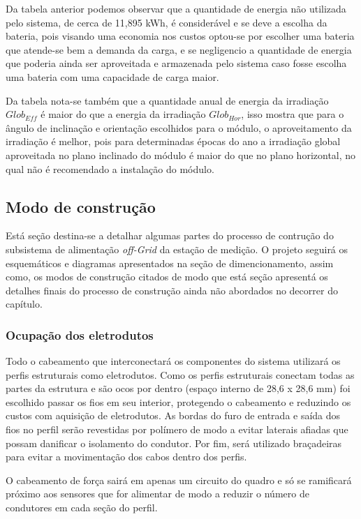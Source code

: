	Da tabela anterior podemos observar que a quantidade de energia não utilizada pelo sistema, de cerca de 11,895 kWh, é considerável e se deve a escolha da bateria, pois visando uma economia nos custos optou-se por escolher uma bateria que atende-se bem a demanda da carga, e se negligencio a quantidade de energia que poderia ainda ser aproveitada e armazenada pelo sistema caso fosse escolha uma bateria com uma capacidade de carga maior. 
	
	Da tabela nota-se também que a quantidade anual de energia da irradiação $Glob_{Eff}$ é maior do que a energia da irradiação $Glob_{Hor}$, isso mostra que para o ângulo de inclinação e orientação escolhidos para o módulo, o aproveitamento da irradiação é melhor, pois para determinadas épocas do ano a irradiação global aproveitada no plano inclinado do módulo é maior do que no plano horizontal, no qual não é recomendado a instalação do módulo.

\subsection{Modo de construção}

Está seção destina-se a detalhar algumas partes do processo de contrução do subsistema de alimentação \textit{off-Grid} da estação de medição. O projeto seguirá os esquemáticos e diagramas apresentados na seção de dimencionamento, assim como, os modos de construção citados de modo que está seção apresentá os detalhes finais do processo de construção ainda não abordados no decorrer do capítulo.

\subsubsection{Ocupação dos eletrodutos}

Todo o cabeamento que interconectará os componentes do sistema utilizará os perfis estruturais como eletrodutos. Como os perfis estruturais conectam todas as partes da estrutura e são ocos por dentro (espaço interno de 28,6 x 28,6 mm) foi escolhido passar os fios em seu interior, protegendo o cabeamento e reduzindo os custos com aquisição de eletrodutos. As bordas do furo de entrada e saída dos fios no perfil serão revestidas por polímero de modo a evitar laterais afiadas que possam danificar o isolamento do condutor. Por fim, será utilizado braçadeiras para evitar a movimentação dos cabos dentro dos perfis.

O cabeamento de força sairá em apenas um circuito do quadro e só se ramificará próximo aos sensores que for alimentar de modo a reduzir o número de condutores em cada seção do perfil.

